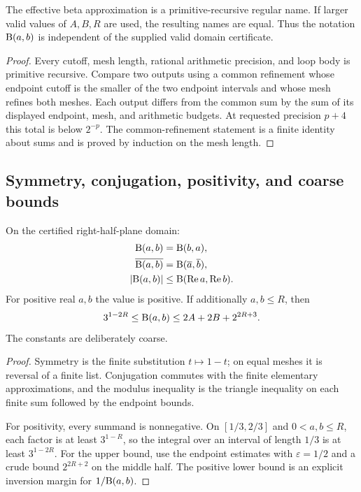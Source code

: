 \begin{theorem}\label{thm:beta-name}
The effective beta approximation is a primitive-recursive regular name.  If larger valid values of $A,B,R$ are used, the resulting names are equal.  Thus the notation $\mathrm B(a,b)$ is independent of the supplied valid domain certificate.
\end{theorem}

\begin{proof}
Every cutoff, mesh length, rational arithmetic precision, and loop body is primitive recursive.  Compare two outputs using a common refinement whose endpoint cutoff is the smaller of the two endpoint intervals and whose mesh refines both meshes.  Each output differs from the common sum by the sum of its displayed endpoint, mesh, and arithmetic budgets.  At requested precision $p+4$ this total is below $2^{-p}$.  The common-refinement statement is a finite identity about sums and is proved by induction on the mesh length.
\end{proof}

\subsection{Symmetry, conjugation, positivity, and coarse bounds}

\begin{theorem}\label{thm:basic-laws}
On the certified right-half-plane domain:
\begin{align*}
 \mathrm B(a,b)&=\mathrm B(b,a),\\
 \overline{\mathrm B(a,b)}&=\mathrm B(\overline a,\overline b),\\
 |\mathrm B(a,b)|&\le \mathrm B(\operatorname{Re} a,\operatorname{Re} b).
\end{align*}
For positive real $a,b$ the value is positive.  If additionally $a,b\le R$, then
\[
 3^{1-2R}\le \mathrm B(a,b)\le 2A+2B+2^{2R+3}.
\]
The constants are deliberately coarse.
\end{theorem}

\begin{proof}
Symmetry is the finite substitution $t\mapsto1-t$; on equal meshes it is reversal of a finite list.  Conjugation commutes with the finite elementary approximations, and the modulus inequality is the triangle inequality on each finite sum followed by the endpoint bounds.

For positivity, every summand is nonnegative.  On $[1/3,2/3]$ and $0<a,b\le R$, each factor is at least $3^{1-R}$, so the integral over an interval of length $1/3$ is at least $3^{1-2R}$.  For the upper bound, use the endpoint estimates with $\varepsilon=1/2$ and a crude bound $2^{2R+2}$ on the middle half.  The positive lower bound is an explicit inversion margin for $1/\mathrm B(a,b)$.
\end{proof}

